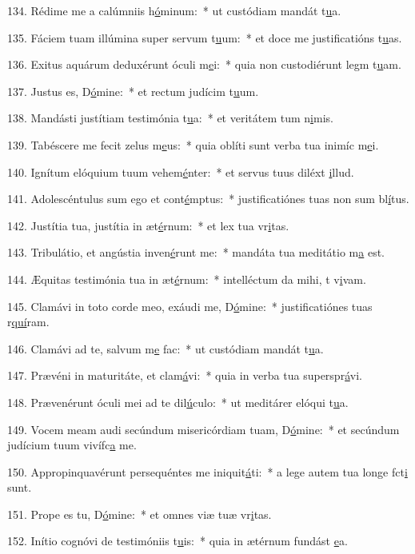 134. Rédime me a calúmniis h\uline{ó}minum:~* ut custódiam mandát t\uline{u}a.\par 
135. Fáciem tuam illúmina super servum t\uline{u}um:~* et doce me justificatións t\uline{u}as.\par 
136. Exitus aquárum deduxérunt óculi m\uline{e}i:~* quia non custodiérunt legm t\uline{u}am.\par 
137. Justus es, D\uline{ó}mine:~* et rectum judícim t\uline{u}um.\par 
138. Mandásti justítiam testimónia t\uline{u}a:~* et veritátem tum n\uline{i}mis.\par 
139. Tabéscere me fecit zelus m\uline{e}us:~* quia oblíti sunt verba tua inimíc m\uline{e}i.\par 
140. Ignítum elóquium tuum vehem\uline{é}nter:~* et servus tuus diléxt \uline{i}llud.\par 
141. Adolescéntulus sum ego et cont\uline{é}mptus:~* justificatiónes tuas non sum bl\uline{í}tus.\par 
142. Justítia tua, justítia in æt\uline{é}rnum:~* et lex tua vr\uline{i}tas.\par 
143. Tribulátio, et angústia inven\uline{é}runt me:~* mandáta tua meditátio m\uline{a} est.\par 
144. Æquitas testimónia tua in æt\uline{é}rnum:~* intelléctum da mihi, t v\uline{i}vam.\par 
145. Clamávi in toto corde meo, exáudi me, D\uline{ó}mine:~* justificatiónes tuas r\uline{quí}ram.\par 
146. Clamávi ad te, salvum m\uline{e} fac:~* ut custódiam mandát t\uline{u}a.\par 
147. Prævéni in maturitáte, et clam\uline{á}vi:~* quia in verba tua superspr\uline{á}vi.\par 
148. Prævenérunt óculi mei ad te dil\uline{ú}culo:~* ut meditárer elóqui t\uline{u}a.\par 
149. Vocem meam audi secúndum misericórdiam tuam, D\uline{ó}mine:~* et secúndum judícium tuum vivífc\uline{a} me.\par 
150. Appropinquavérunt persequéntes me iniquit\uline{á}ti:~* a lege autem tua longe fct\uline{i} sunt.\par 
151. Prope es tu, D\uline{ó}mine:~* et omnes viæ tuæ vr\uline{i}tas.\par 
152. Inítio cognóvi de testimóniis t\uline{u}is:~* quia in ætérnum fundást \uline{e}a.\par 
